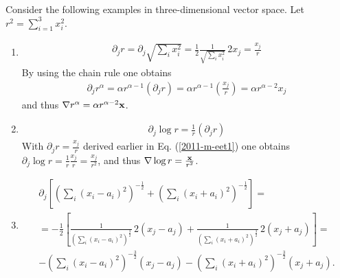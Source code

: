 {
\color{blue}
\bexample

Consider the following examples in three-dimensional vector space.
Let $r^2 = \sum_{i=1 }^3 x_i^2$.

\begin{enumerate}
\item
\begin{equation}
\begin{array}{l}
  \partial_jr =  \partial_j \sqrt{\sum_ix_i^2} =
  \frac{1}{2}\frac{1}{\sqrt{\sum_ix_i^2}}\,2x_j =
  \frac{x_j}{r}
\end{array}
\end{equation}
By using the chain  rule one obtains
\begin{equation}
\begin{array}{l}
  \partial_jr^\alpha =
  \alpha r^{\alpha-1}\left(\partial_jr\right) =
  \alpha r^{\alpha-1}\left(\frac{x_j}{r}\right)=
  \alpha r^{\alpha-2}x_j
\end{array}
\label{2011-m-eet1}
\end{equation}
and thus $\nabla r^\alpha = \alpha r^{\alpha-2}{\bf x}$.


\item
\begin{equation}
\begin{array}{l}
  \partial_j \log r=\frac{1}{r}\left(\partial_jr\right)
\end{array}
\end{equation}
With $
  \partial_jr = \frac{x_j}{r}
$  derived earlier in Eq. (\ref{2011-m-eet1}) one obtains
$
 \partial_j \log r= \frac{1}{r}\frac{x_j}{r}=
  \frac{x_j}{r^2}
$,
and thus $\nabla  \log r =\frac{{\bf x}}{r^2}$.

\item
\begin{equation}
\begin{array}{l}
  \partial_j
  \left[
    \left(
      \sum_i\left(x_i-a_i\right)^2
    \right)^{-\frac{1}{2}}+
    \left(
      \sum_i\left(x_i+a_i\right)^2
    \right)^{-\frac{1}{2}}
  \right]=
\\
  = -\frac{1}{2}\left[\frac{1}{\left(\sum_i\left(x_i-a_i\right)^2\right)^
    \frac{3}{2}}\,2\left(x_j-a_j\right)
  +\frac{1}{\left(\sum_i\left(x_i+a_i\right)^2\right)^\frac{3}{2}}\,
    2\left(x_j+a_j\right)\right]= \\
 -\left(\sum_i\left(x_i-a_i\right)^2\right)^{-\frac{3}{2}}\left(x_j-a_j\right)-
    \left(\sum_i\left(x_i+a_i\right)^2\right)^{-\frac{3}{2}}\left(x_j+a_j\right)   .
\end{array}
\end{equation}


\end{enumerate}}
